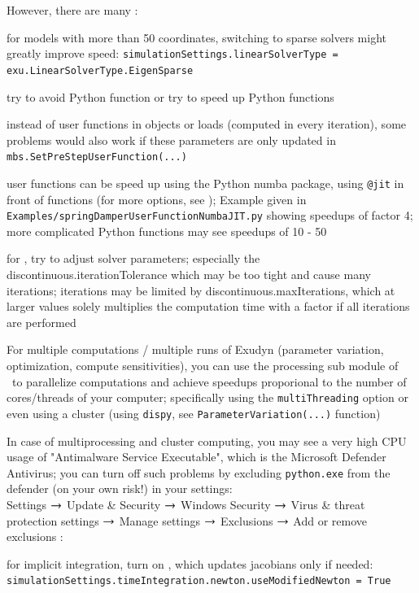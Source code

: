 \noindent However, there are many :
\bi
  \item for models with more than 50 coordinates, switching to sparse solvers might greatly improve speed: \texttt{simulationSettings.linearSolverType = exu.LinearSolverType.EigenSparse}
  \item try to avoid Python function or try to speed up Python functions
  \item instead of user functions in objects or loads (computed in every iteration), some problems would also work if these parameters are only updated in \texttt{mbs.SetPreStepUserFunction(...)}
  \item user functions can be speed up using the Python numba package, using \texttt{@jit} in front of functions (for more options, see ); Example given in \texttt{Examples/springDamperUserFunctionNumbaJIT.py} showing speedups of factor 4; more complicated Python functions may see speedups of 10 - 50
  \item for , try to adjust solver parameters; especially the discontinuous.iterationTolerance which may be too tight and cause many iterations; iterations may be limited by discontinuous.maxIterations, which at larger values solely multiplies the computation time with a factor if all iterations are performed
  \item For multiple computations / multiple runs of Exudyn (parameter variation, optimization, compute sensitivities), you can use the processing sub module of \codeName\ to parallelize computations and achieve speedups proporional to the number of cores/threads of your computer; specifically using the \texttt{multiThreading} option or even using a cluster (using \texttt{dispy}, see \texttt{ParameterVariation(...)} function)
  \item In case of multiprocessing and cluster computing, you may see a very high CPU usage of "Antimalware Service Executable", which is the Microsoft Defender Antivirus; you can turn off such problems by excluding \texttt{python.exe} from the defender (on your own risk!) in your settings:\\
  Settings $\rightarrow$ Update \& Security $\rightarrow$ Windows Security $\rightarrow$ Virus \& threat protection settings $\rightarrow$ Manage settings $\rightarrow$ Exclusions $\rightarrow$ Add or remove exclusions 
\ei
{}:
\bi
  \item for implicit integration, turn on , which updates jacobians only if needed: \texttt{simulationSettings.timeIntegration.newton.useModifiedNewton = True}
